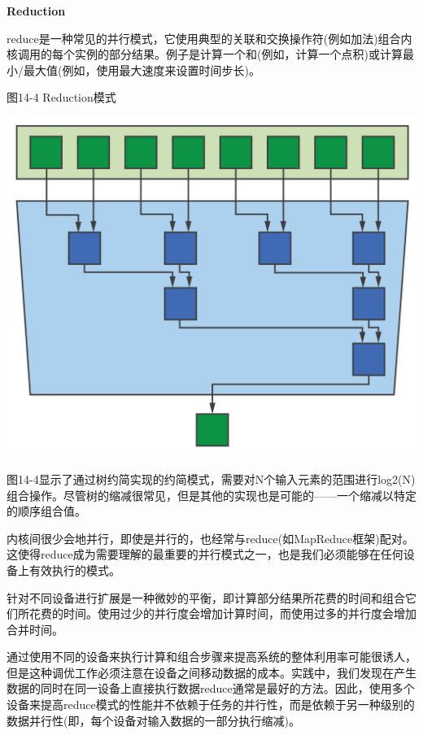\hspace*{\fill} \par %
\textbf{Reduction}

reduce是一种常见的并行模式，它使用典型的关联和交换操作符(例如加法)组合内核调用的每个实例的部分结果。例子是计算一个和(例如，计算一个点积)或计算最小/最大值(例如，使用最大速度来设置时间步长)。\par

\hspace*{\fill} \par %
图14-4 Reduction模式
\begin{center}
	\includegraphics[width=1.\textwidth]{content/chapter-14/images/4}
\end{center}

图14-4显示了通过树约简实现的约简模式，需要对N个输入元素的范围进行log2(N)组合操作。尽管树的缩减很常见，但是其他的实现也是可能的——一个缩减以特定的顺序组合值。\par

内核间很少会地并行，即使是并行的，也经常与reduce(如MapReduce框架)配对。这使得reduce成为需要理解的最重要的并行模式之一，也是我们必须能够在任何设备上有效执行的模式。\par

针对不同设备进行扩展是一种微妙的平衡，即计算部分结果所花费的时间和组合它们所花费的时间。使用过少的并行度会增加计算时间，而使用过多的并行度会增加合并时间。\par

通过使用不同的设备来执行计算和组合步骤来提高系统的整体利用率可能很诱人，但是这种调优工作必须注意在设备之间移动数据的成本。实践中，我们发现在产生数据的同时在同一设备上直接执行数据reduce通常是最好的方法。因此，使用多个设备来提高reduce模式的性能并不依赖于任务的并行性，而是依赖于另一种级别的数据并行性(即，每个设备对输入数据的一部分执行缩减)。\par

